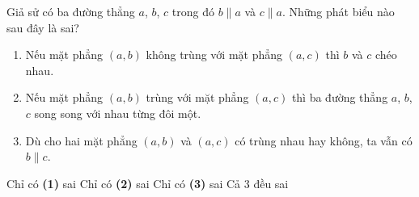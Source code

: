 \begin{ex}[NB]%
	Giả sử có ba đường thẳng $a$, $b$, $c$ trong đó $b \parallel a$ và $c \parallel a$. Những phát biểu nào sau đây là sai?
	\begin{enumerate}[\bfseries (1)]
		\item Nếu mặt phẳng $\left(a,b\right)$ không trùng với mặt phẳng $\left(a,c\right)$ thì $b$ và $c$ chéo nhau.
		\item Nếu mặt phẳng $\left(a,b\right)$ trùng với mặt phẳng $\left(a,c\right)$ thì ba đường thẳng $a$, $b$, $c$ song song với nhau từng đôi một.
		\item Dù cho hai mặt phẳng $\left(a, b\right)$ và $\left(a,c\right)$ có trùng nhau hay không, ta vẫn có  $b \parallel c$.
	\end{enumerate}
	\choice
	{Chỉ có \textbf{(1)} sai}
	{Chỉ có \textbf{(2)} sai}
	{Chỉ có \textbf{(3)} sai}
	{\True Cả 3 đều sai}
\end{ex}

